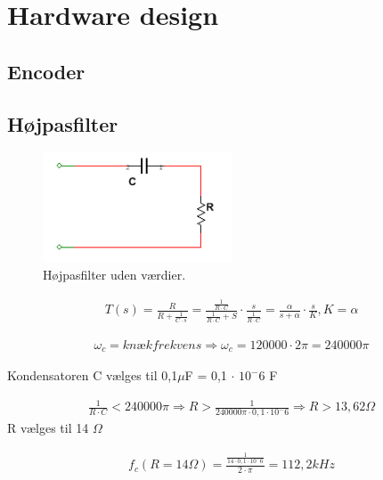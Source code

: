 \chapter{Hardware design}

\section{Encoder}

\section{Højpasfilter}

\begin{figure}[htbp]
	\centering
	\includegraphics[width=0.50\textwidth]{billeder/HWdesign/HP_UV.png}
	\caption{Højpasfilter uden værdier.}
	\label{fig:HP_UV}
\end{figure}


\begin{align}
\label{eq: HP_networkfunction}T(s) = \frac{R}{R+\frac{1}{C \cdot s}} = \frac{\frac{1}{R \cdot C}}{\frac{1}{R \cdot C}+S} \cdot \frac{s}{\frac{1}{R \cdot C}} = \frac{\alpha}{s + \alpha} \cdot \frac{s}{K}         , K= \alpha
\end{align}

\begin{align}
	\omega_c = knækfrekvens \Rightarrow \omega_c = 120000 \cdot 2 \pi = 240000\pi 
\end{align} 

	Kondensatoren C vælges til 0,1$\mu$F  = 0,1 $\cdot$  $10^-6$ F

\begin{align}
	\frac{1}{R \cdot C} < 240000\pi \Rightarrow R > \frac{1}{240000\pi \cdot 0,1 \cdot 10^-6}
	\Rightarrow R > 13,62 \Omega
\end{align}
	R vælges til 14 $\Omega$

\begin{align}
	f_c (R=14\Omega) = \frac{\frac{1}{14 \cdot 0,1 \cdot 10^-6}}{2 \cdot \pi} =112,2kHz
\end{align}

